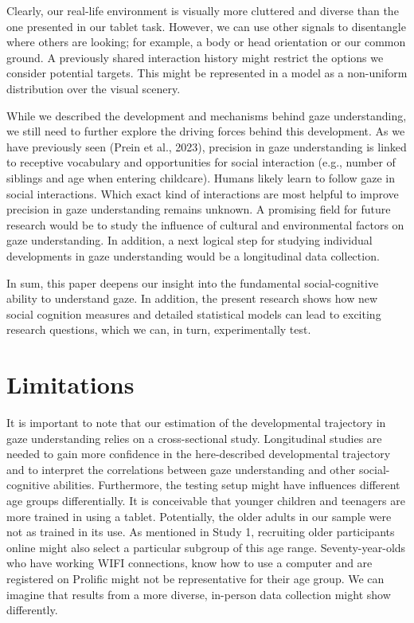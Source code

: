 \documentclass[
  man,mask,floatsintext]{apa6}
\begin{document}
Clearly, our real-life environment is visually more cluttered and diverse than the one presented in our tablet task. However, we can use other signals to disentangle where others are looking; for example, a body or head orientation or our common ground. A previously shared interaction history might restrict the options we consider potential targets. This might be represented in a model as a non-uniform distribution over the visual scenery.

While we described the development and mechanisms behind gaze understanding, we still need to further explore the driving forces behind this development. As we have previously seen (Prein et al., 2023), precision in gaze understanding is linked to receptive vocabulary and opportunities for social interaction (e.g., number of siblings and age when entering childcare). Humans likely learn to follow gaze in social interactions. Which exact kind of interactions are most helpful to improve precision in gaze understanding remains unknown. A promising field for future research would be to study the influence of cultural and environmental factors on gaze understanding. In addition, a next logical step for studying individual developments in gaze understanding would be a longitudinal data collection.

In sum, this paper deepens our insight into the fundamental social-cognitive ability to understand gaze. In addition, the present research shows how new social cognition measures and detailed statistical models can lead to exciting research questions, which we can, in turn, experimentally test.

\hypertarget{limitations}{%
\section{Limitations}\label{limitations}}

It is important to note that our estimation of the developmental trajectory in gaze understanding relies on a cross-sectional study. Longitudinal studies are needed to gain more confidence in the here-described developmental trajectory and to interpret the correlations between gaze understanding and other social-cognitive abilities. Furthermore, the testing setup might have influences different age groups differentially. It is conceivable that younger children and teenagers are more trained in using a tablet. Potentially, the older adults in our sample were not as trained in its use. As mentioned in Study 1, recruiting older participants online might also select a particular subgroup of this age range. Seventy-year-olds who have working WIFI connections, know how to use a computer and are registered on Prolific might not be representative for their age group. We can imagine that results from a more diverse, in-person data collection might show differently.
\end{document}
